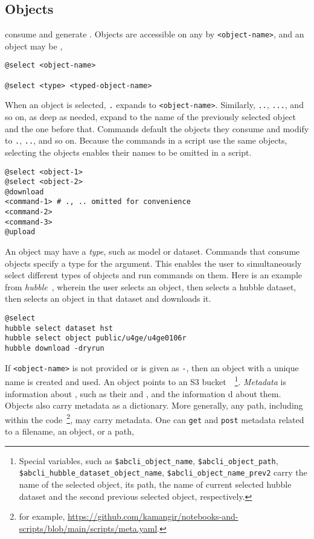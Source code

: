 \subsection{Objects}\label{objects}\label{select}\label{selected}

 consume and generate . Objects are accessible on any  by \texttt{<object-name>}, and an object may be ,
%
\begin{verbatim}
@select <object-name>

@select <type> <typed-object-name>
\end{verbatim}
%
When an object is selected, \texttt{.} expands to \texttt{<object-name>}. Similarly, \texttt{..}, \texttt{...}, and so on, as deep as needed, expand to the name of the previously selected object and the one before that. Commands default the objects they consume and modify to \texttt{.}, \texttt{..}, and so on. Because the commands in a script use the same objects, selecting the objects enables their names to be omitted in a script.
%
\begin{verbatim}
@select <object-1>
@select <object-2>
@download
<command-1> # ., .. omitted for convenience
<command-2>
<command-3>
@upload
\end{verbatim}
%
An object may have a \emph{type}, such as model or dataset. Commands that consume objects specify a type for the argument. This enables the user to simultaneously select different types of objects and run commands on them. Here is an example from \emph{hubble}~\cite{hubble}, wherein the user selects an object, then selects a hubble dataset,  then selects an object in that dataset and downloads it.
%
\begin{verbatim}
@select
hubble select dataset hst
hubble select object public/u4ge/u4ge0106r
hubble download -dryrun
\end{verbatim}
%
If \texttt{<object-name>} is not provided or is given as \texttt{-}, then an object with a unique name is created and used. An object points to an S3 bucket~\cite{aws_s3}~\footnote{Special variables, such as \texttt{\$abcli\_object\_name}, \texttt{\$abcli\_object\_path}, \texttt{\$abcli\_hubble\_dataset\_object\_name}, \texttt{\$abcli\_object\_name\_prev2} carry the name of the selected object, its path, the name of current selected hubble dataset and the second previous selected object, respectively.}. \emph{Metadata} is information about , such as their  and , and the information d about them. Objects also carry metadata as a dictionary. More generally, any path, including within the code~\footnote{for example, \url{https://github.com/kamangir/notebooks-and-scripts/blob/main/scripts/meta.yaml}.}, may carry metadata. One can \texttt{get} and \texttt{post} metadata related to a filename, an object, or a path,
